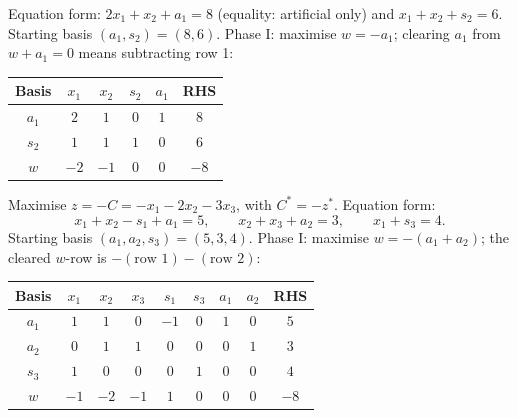 \begin{solutions}
  \item Equation form: $2x_{1}+x_{2}+a_{1}=8$ (equality: artificial only)
        and $x_{1}+x_{2}+s_{2}=6$. Starting basis $(a_{1},s_{2})=(8,6)$.
        Phase I: maximise $w=-a_{1}$; clearing $a_{1}$ from $w+a_{1}=0$
        means subtracting row 1:
        \begin{center}
        \begin{tabular}{c|cccc|c}
        Basis & $x_{1}$ & $x_{2}$ & $s_{2}$ & $a_{1}$ & RHS\\
        \hline
        $a_{1}$ & $2$ & $1$ & $0$ & $1$ & $8$\\
        $s_{2}$ & $1$ & $1$ & $1$ & $0$ & $6$\\
        \hline
        $w$ & $-2$ & $-1$ & $0$ & $0$ & $-8$\\
        \end{tabular}
        \end{center}

  \item Maximise $z=-C=-x_{1}-2x_{2}-3x_{3}$, with $C^{*}=-z^{*}$.
        Equation form:
        \[
          x_{1}+x_{2}-s_{1}+a_{1}=5,\qquad
          x_{2}+x_{3}+a_{2}=3,\qquad
          x_{1}+s_{3}=4 .
        \]
        Starting basis $(a_{1},a_{2},s_{3})=(5,3,4)$. Phase I: maximise
        $w=-(a_{1}+a_{2})$; the cleared $w$-row is
        $-(\text{row 1})-(\text{row 2})$:
        \begin{center}
        \begin{tabular}{c|ccccccc|c}
        Basis & $x_{1}$ & $x_{2}$ & $x_{3}$ & $s_{1}$ & $s_{3}$
              & $a_{1}$ & $a_{2}$ & RHS\\
        \hline
        $a_{1}$ & $1$ & $1$ & $0$ & $-1$ & $0$ & $1$ & $0$ & $5$\\
        $a_{2}$ & $0$ & $1$ & $1$ & $0$ & $0$ & $0$ & $1$ & $3$\\
        $s_{3}$ & $1$ & $0$ & $0$ & $0$ & $1$ & $0$ & $0$ & $4$\\
        \hline
        $w$ & $-1$ & $-2$ & $-1$ & $1$ & $0$ & $0$ & $0$ & $-8$\\
        \end{tabular}
        \end{center}


\end{solutions}

